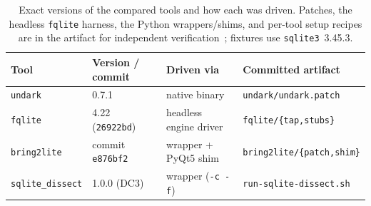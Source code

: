 \documentclass[10pt,a4paper]{article}
\newcommand{\code}[1]{\texttt{#1}}
\begin{document}
\begin{table}[t]
\centering\small
\caption{Exact versions of the compared tools and how each was driven. Patches, the
headless \code{fqlite} harness, the Python wrappers/shims, and per-tool setup recipes are
in the artifact for independent verification~\cite{sqlite4n6}; fixtures use
\code{sqlite3}~3.45.3.}
\label{tab:tools}
\setlength{\tabcolsep}{3.5pt}
\begin{tabular}{@{}llll@{}}
\toprule
Tool & Version / commit & Driven via & Committed artifact \\
\midrule
\code{undark}          & 0.7.1                  & native binary          & \code{undark/undark.patch} \\
\code{fqlite}          & 4.22 (\code{26922bd})  & headless engine driver & \code{fqlite/\{tap,stubs\}} \\
\code{bring2lite}      & commit \code{e876bf2}  & wrapper + PyQt5 shim   & \code{bring2lite/\{patch,shim\}} \\
\code{sqlite\_dissect} & 1.0.0 (DC3)            & wrapper (\code{-c -f}) & \code{run-sqlite-dissect.sh} \\
\bottomrule
\end{tabular}
\end{table}
\end{document}
